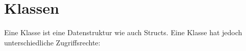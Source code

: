 \section{Klassen}
Eine Klasse ist eine Datenstruktur wie auch Structs. Eine Klasse hat jedoch unterschiedliche Zugriffsrechte:




